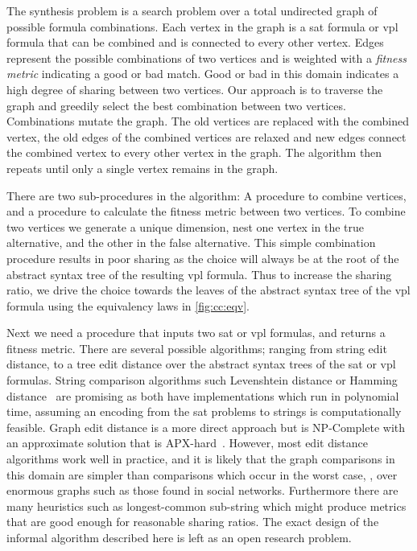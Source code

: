 The synthesis problem is a search problem over a total undirected graph of
possible formula combinations. Each vertex in the graph is a \ac{sat} formula or
\ac{vpl} formula that can be combined and is connected to every other vertex.
Edges represent the possible combinations of two vertices and is weighted with a
\emph{fitness metric} indicating a good or bad match. Good or bad in this domain
indicates a high degree of sharing between two vertices. Our approach is to
traverse the graph and greedily select the best combination between two
vertices. Combinations mutate the graph. The old vertices are replaced with the
combined vertex, the old edges of the combined vertices are relaxed and new
edges connect the combined vertex to every other vertex in the graph. The
algorithm then repeats until only a single vertex remains in the graph.

There are two sub-procedures in the algorithm: A procedure to combine vertices,
and a procedure to calculate the fitness metric between two vertices. To combine
two vertices we generate a unique dimension, nest one vertex in the true
alternative, and the other in the false alternative. This simple combination
procedure results in poor sharing as the choice will always be at the root of
the abstract syntax tree of the resulting \ac{vpl} formula. Thus to increase the
sharing ratio, we drive the choice towards the leaves of the abstract syntax
tree of the \ac{vpl} formula using the equivalency laws in \autoref{fig:cc:eqv}.

Next we need a procedure that inputs two \ac{sat} or \ac{vpl} formulas, and
returns a fitness metric. There are several possible algorithms; ranging from
string edit distance, to a tree edit distance over the abstract syntax trees of
the \ac{sat} or \ac{vpl} formulas. String comparison algorithms such Levenshtein
distance\cite{Levenshtein_SPD66} or Hamming distance~\cite{H:BST50} are
promising as both have implementations which run in polynomial time, assuming an
encoding from the \ac{sat} problems to strings is computationally feasible.
Graph edit distance is a more direct approach but is NP-Complete with an
approximate solution that is APX-hard~\cite{hardnessOfGraphEditDistance}.
However, most edit distance algorithms work well in practice, and it is likely
that the graph comparisons in this domain are simpler than comparisons which
occur in the worst case, \eg{}, over enormous graphs such as those found in
social networks. Furthermore there are many heuristics such as longest-common
sub-string which might produce metrics that are good enough for reasonable
sharing ratios. The exact design of the informal algorithm described here is
left as an open research problem.

